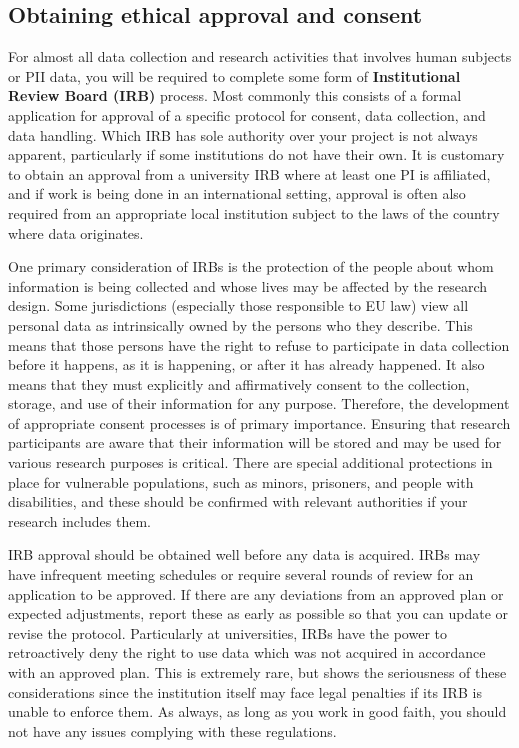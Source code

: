 \subsection{Obtaining ethical approval and consent}

For almost all data collection and research activities that involves
human subjects or PII data,
you will be required to complete some form of \textbf{Institutional Review Board (IRB)} process.
Most commonly this consists of a formal application for approval of a specific
protocol for consent, data collection, and data handling.
Which IRB has sole authority over your project is not always apparent,
particularly if some institutions do not have their own.
It is customary to obtain an approval from a university IRB
where at least one PI is affiliated,
and if work is being done in an international setting,
approval is often also required
from an appropriate local institution subject to the laws of the country where data originates.

One primary consideration of IRBs
is the protection of the people about whom information is being collected
and whose lives may be affected by the research design.
Some jurisdictions (especially those responsible to EU law) view all personal data
as intrinsically owned by the persons who they describe.
This means that those persons have the right to refuse to participate in data collection
before it happens, as it is happening, or after it has already happened.
It also means that they must explicitly and affirmatively consent
to the collection, storage, and use of their information for any purpose.
Therefore, the development of appropriate consent processes is of primary importance.
Ensuring that research participants are aware that their information
will be stored and may be used for various research purposes is critical.
There are special additional protections in place for vulnerable populations,
such as minors, prisoners, and people with disabilities,
and these should be confirmed with relevant authorities if your research includes them.

IRB approval should be obtained well before any data is acquired. 
IRBs may have infrequent meeting schedules
or require several rounds of review for an application to be approved.
If there are any deviations from an approved plan or expected adjustments,
report these as early as possible so that you can update or revise the protocol.
Particularly at universities, IRBs have the power to retroactively deny
the right to use data which was not acquired in accordance with an approved plan.
This is extremely rare, but shows the seriousness of these considerations
since the institution itself may face legal penalties if its IRB
is unable to enforce them. As always, as long as you work in good faith,
you should not have any issues complying with these regulations.

